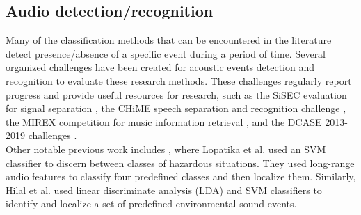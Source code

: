 \documentclass{ieeeaccess}
\begin{document}
\subsection{Audio detection/recognition} \label{subsec:recog}
Many of the classification methods that can be encountered in the literature detect presence/absence of a specific event during a period of time. Several organized challenges have been created for acoustic events detection and recognition to evaluate these research methods. These challenges regularly report progress and provide useful resources for research, such as the SiSEC evaluation for signal separation \cite{11}, the CHiME speech separation and recognition challenge \cite{12}, the MIREX competition for music information retrieval \cite{13}, and the DCASE 2013-2019 challenges \cite{4}.\\
Other notable previous work includes \cite{14}, where Lopatika et al. used an SVM classifier to discern between classes of hazardous situations. They used long-range audio features to classify four predefined classes and then localize them. Similarly, Hilal et al. \cite{15} used linear discriminate analysis (LDA) and SVM classifiers to identify and localize a set of predefined environmental sound events.
\end{document}
